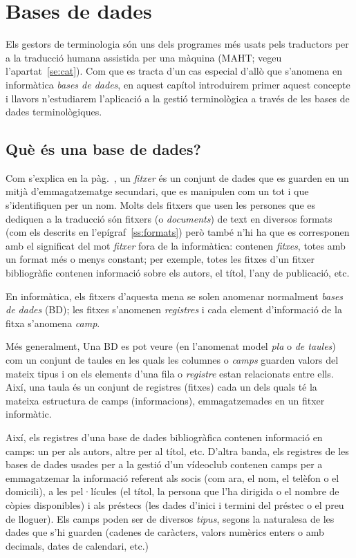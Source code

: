 \chapter{Bases de dades}
\label{se:basesdades}

Els gestors de terminologia són uns dels programes més usats pels
traductors per a la traducció humana assistida per una màquina (MAHT;
vegeu l'apartat~\ref{se:cat}). Com que es tracta d'un cas especial
d'allò que s'anomena en informàtica \emph{bases de dades}, en aquest
capítol introduirem primer aquest concepte i llavors n'estudiarem
l'aplicació a la gestió terminològica a través de les bases de dades
terminològiques.


\section{Què és una base de dades?} 

Com s'explica en la pàg.~\pageref{pg:fitxer}, un \emph{fitxer} és un
conjunt de dades que es guarden en un mitjà d'emmagatzematge
secundari, que es manipulen com un tot i que s'identifiquen per un
nom. Molts dels fitxers que usen les persones que es dediquen a la
traducció són fitxers (o \emph{documents}) de text en diversos formats
(com els descrits en l'epígraf~\ref{ss:formats}) però també n'hi ha
que es corresponen amb el significat del mot \emph{fitxer} fora de la
informàtica: contenen \emph{fitxes}, totes amb un format més o menys
constant; per exemple, totes les fitxes d'un fitxer bibliogràfic
contenen informació sobre els autors, el títol, l'any de publicació,
etc.

En informàtica, els fitxers d'aquesta mena se solen anomenar
normalment \emph{bases de dades} (BD); les fitxes s'anomenen
\emph{registres} i cada element d'informació de la fitxa s'anomena
\emph{camp}.

Més generalment, Una BD es pot veure (en l'anomenat model \emph{pla} o
\emph{de taules}) com un conjunt de taules en les quals les columnes o
\emph{camps} guarden valors del mateix tipus i on els elements d'una
fila o \emph{registre} estan relacionats entre ells. Així, una taula
és un conjunt de registres (fitxes) cada un dels quals té la mateixa
estructura de camps (informacions), emmagatzemades en un fitxer
informàtic.

Així, els registres d'una base de dades bibliogràfica contenen
informació en camps: un per als autors, altre per al títol,
etc. D'altra banda, els registres de les bases de dades usades per a
la gestió d'un vídeoclub contenen camps per a emmagatzemar la
informació referent als socis (com ara, el nom, el telèfon o el
domicili), a les pel·lícules (el títol, la persona que l'ha dirigida o
el nombre de còpies disponibles) i als préstecs (les dades d'inici i
termini del préstec o el preu de lloguer). Els camps poden ser de
diversos \emph{tipus}, segons la naturalesa de les dades que s'hi
guarden (cadenes de caràcters, valors numèrics enters o amb decimals,
dates de calendari, etc.)

